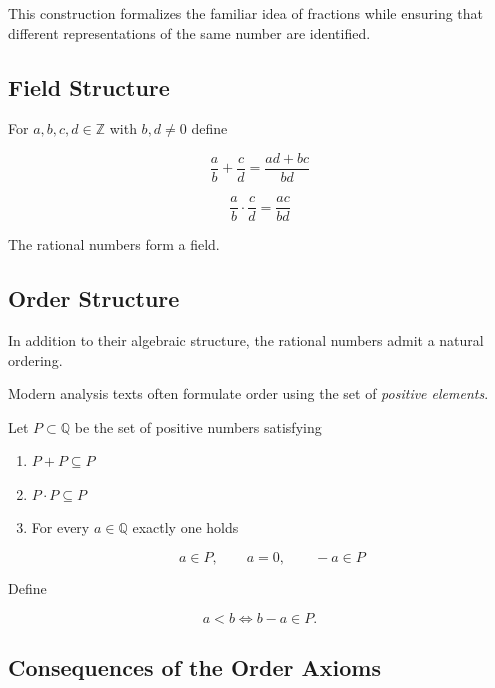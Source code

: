 This construction formalizes the familiar idea of fractions while ensuring
that different representations of the same number are identified.

\subsection{Field Structure}

\begin{definition}
For $a,b,c,d \in \mathbb{Z}$ with $b,d\neq0$ define

\[
\frac{a}{b}+\frac{c}{d}
=
\frac{ad+bc}{bd}
\]

\[
\frac{a}{b}\cdot\frac{c}{d}
=
\frac{ac}{bd}
\]
\end{definition}

\begin{theorem}
The rational numbers form a field.
\end{theorem}

\subsection{Order Structure}

In addition to their algebraic structure, the rational numbers admit
a natural ordering.

Modern analysis texts often formulate order using the set of
\emph{positive elements}.

\begin{definition}

Let $P\subset \mathbb{Q}$ be the set of positive numbers satisfying

\begin{enumerate}

\item $P+P \subseteq P$
\item $P\cdot P \subseteq P$
\item For every $a\in\mathbb{Q}$ exactly one holds

\[
a\in P, \qquad a=0, \qquad -a\in P
\]

\end{enumerate}

Define

\[
a<b \iff b-a\in P.
\]

\end{definition}

\subsection{Consequences of the Order Axioms}

